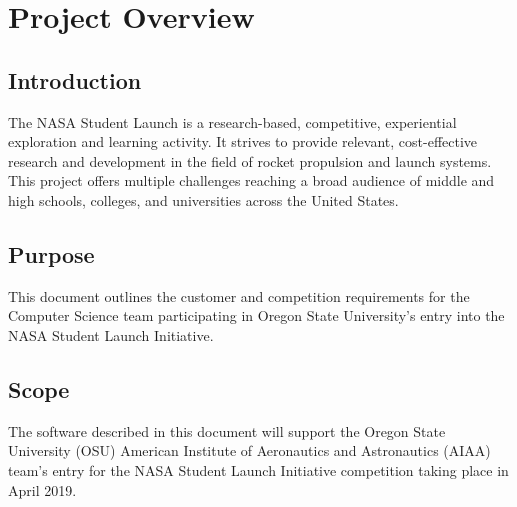 \documentclass[onecolumn, draftclsnofoot, 10pt, compsoc]{IEEEtran}
\begin{document}

\section{Project Overview}
\subsection{Introduction}
The NASA Student Launch is a research-based, competitive, experiential exploration and learning activity. It strives to provide relevant, cost-effective research and development in the field of rocket propulsion and launch systems. This project offers multiple challenges reaching a broad audience of middle and high schools, colleges, and universities across the United States.

\subsection{Purpose}
This document outlines the customer and competition requirements for the Computer Science team participating in Oregon State University's entry into the NASA Student Launch Initiative.

\subsection{Scope}
The software described in this document will support the Oregon State University (OSU) American Institute of Aeronautics and Astronautics (AIAA) team's entry for the NASA Student Launch Initiative competition taking place in April 2019. 

\end{document}
